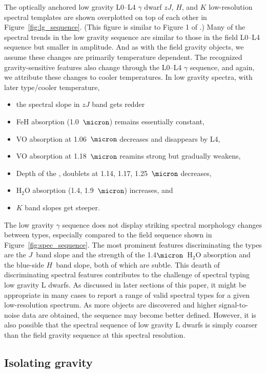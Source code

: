 \documentclass[12pt,preprint]{aastex}
\begin{document}
The optically anchored low gravity L0--L4 $\gamma$ dwarf $zJ$, $H$, and $K$ low-resolution spectral templates are shown overplotted on top of each other in Figure~\ref{fig:lg_sequence}. (This figure is similar to Figure 1 of \cite{Gagne:2015to}.)
Many of the spectral trends in the low gravity sequence are similar to those in the field L0--L4 sequence but smaller in amplitude. And as with the field gravity objects, we assume these changes are primarily temperature dependent. The recognized gravity-sensitive features also change through the L0--L4 $\gamma$ sequence, and again, we attribute these changes to cooler temperatures.
In low gravity spectra, with later type/cooler temperature,
\begin{itemize}
\item the spectral slope in $zJ$ band gets redder
\item FeH absorption (1.0~$\micron$) remains essentially constant,
\item VO absorption at 1.06~$\micron$ decreases and disappears by L4,
\item VO absorption at 1.18~$\micron$ reamins strong but gradually weakens,
\item Depth of the ,  doublets at 1.14, 1.17, 1.25~$\micron$ decreases,
\item H$_2$O absorption (1.4, 1.9~$\micron$) increases, and
\item $K$ band slopes get steeper.
\end{itemize}

The low gravity $\gamma$ sequence does not display striking spectral morphology changes between types, especially compared to the field sequence shown in Figure~\ref{fig:spec_sequence}.
The most prominent features discriminating the types are the $J$~band slope and the strength of the 1.4$\micron$~H$_2$O absorption and the blue-side $H$~band slope, both of which are subtle.
This dearth of discriminating spectral features contributes to the challenge of spectral typing low gravity L dwarfs.
As discussed in later sections of this paper, it might be appropriate in many cases to report a range of valid spectral types for a given low-resolution spectrum.
As more objects are discovered and higher signal-to-noise data are obtained, the sequence may become better defined.
However, it is also possible that the spectral sequence of low gravity L dwarfs is simply coarser than the field gravity sequence at this spectral resolution.

\subsection{Isolating gravity}
\end{document}
